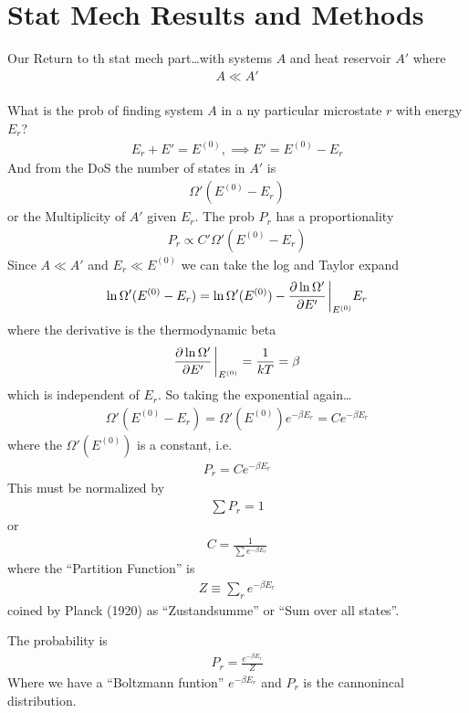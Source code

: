 \documentclass[../main.tex]{subfiles}
\begin{document}
\pagestyle{fancy}

\section{Stat Mech Results and Methods}

Our Return to th stat mech part\dots with systems $A$ and heat reservoir $A'$ where
\begin{align*}
    A \ll A'
\end{align*}

\paragraph{} What is the prob of finding system $A$ in a ny particular microstate $r$ with energy $E_r$?
\begin{align*}
    E_r + E' = E^{(0)}, \implies E' = E^{(0)} - E_r
\end{align*}
And from the DoS the number of states in $A'$ is
\begin{align*}
    \Omega'(E^{(0)} - E_r) 
\end{align*}
or the Multiplicity of $A'$ given $E_r$. The prob $P_r$ has a proportionality
\begin{align*}
    P_r \propto C' \Omega'(E^{(0)} - E_r)
\end{align*}
Since $A \ll A'$ and $E_r \ll E^{(0)}$ we can take the log and Taylor expand
\begin{align*}
    \ln\Omega'(E^{(0)} - E_r) = \ln\Omega'(E^{(0)}) - \pdv{\ln\Omega'}{E'}\eval_{E^{(0)}} E_r
\end{align*}
where the derivative is the thermodynamic beta
\begin{align*}
    \pdv{\ln\Omega'}{E'}\eval_{E^{(0)}} = \frac{1}{kT} = \beta
\end{align*}
which is independent of $E_r$. So taking the exponential again\dots
\begin{align*}
    \Omega'(E^{(0)} - E_r) = \Omega'(E^{(0)})e^{-\beta E_r} = C e^{-\beta E_r}
\end{align*}
where the $\Omega'(E^{(0)})$ is a constant, i.e.
\begin{align*}
    P_r = C e^{-\beta E_r}
\end{align*}
This must be normalized by
\begin{align*}
    \sum P_r = 1
\end{align*}
or
\begin{align*}
    C = \frac{1}{\sum e^{-\beta E_r}}
\end{align*}
where the ``Partition Function'' is
\begin{align*}
    Z \equiv \sum_r e^{-\beta E_r}
\end{align*}
coined by Planck (1920) as ``Zustandsumme'' or ``Sum over all states''.

The probability is
\begin{align*}
    P_r = \frac{e^{-\beta E_r}}{Z}
\end{align*}
Where we have a ``Boltzmann funtion'' $e^{-\beta E_r}$ and $P_r$ is the cannonincal distribution.
\end{document}
